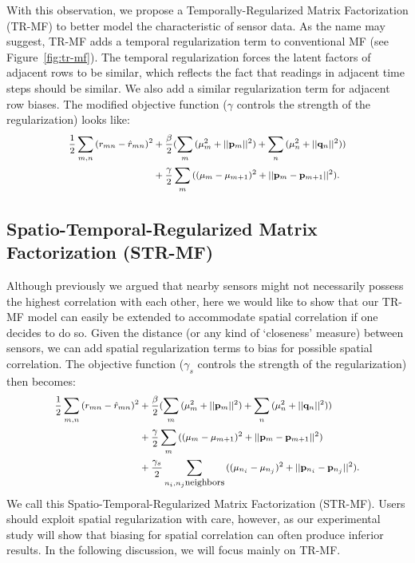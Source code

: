 With this observation, we propose a Temporally-Regularized Matrix Factorization (TR-MF) to better model the characteristic of sensor data. As the name may suggest, TR-MF adds a temporal regularization term to conventional MF (see Figure~\ref{fig:tr-mf}).
The temporal regularization forces the latent factors of adjacent rows to be similar, which reflects the fact that 
readings in adjacent time steps should be similar. We also add a similar regularization term for 
adjacent row biases.
The modified objective function ($\gamma$ controls the strength of the regularization) looks like: 
\begin{equation*}\small \begin{aligned}
\frac{1}{2}\sum_{m,n}{(r_{mn} - \hat{r}_{mn})}^2
&+ \frac{\beta}{2}(\sum_m{(\mu_m^2 + ||\mathbf{p}_m||^2)} + \sum_n{(\mu_n^2 + ||\mathbf{q}_n||^2)}) \\
&+ \frac{\gamma}{2} \sum_m{((\mu_m-\mu_{m+1})^2 + ||\mathbf{p}_m-\mathbf{p}_{m+1}||^2)}.
\end{aligned}\end{equation*}

\subsection{Spatio-Temporal-Regularized Matrix Factorization (STR-MF)}

Although previously we argued that nearby sensors might not necessarily possess the highest correlation with each other, 
here we would like to show that our TR-MF model can easily be extended to accommodate spatial correlation if one decides to do so. 
Given the distance (or any kind of `closeness' measure) between sensors, we can add spatial regularization terms to bias for 
possible spatial correlation.
The objective function ($\gamma_s$ controls the strength of the regularization) then becomes: 
\begin{equation*}\small \begin{aligned}
\frac{1}{2}\sum_{m,n}{(r_{mn} - \hat{r}_{mn})}^2
&+ \frac{\beta}{2}(\sum_m{(\mu_m^2 + ||\mathbf{p}_m||^2)} + \sum_n{(\mu_n^2 + ||\mathbf{q}_n||^2)}) \\
&+ \frac{\gamma}{2} \sum_m{((\mu_m-\mu_{m+1})^2 + ||\mathbf{p}_m-\mathbf{p}_{m+1}||^2)}\\
&+ \frac{\gamma_s}{2} \sum\limits_{n_i, n_j \mbox{neighbors}}{((\mu_{n_i}-\mu_{n_j})^2 + ||\mathbf{p}_{n_i}-\mathbf{p}_{n_j}||^2)}.
\end{aligned}\end{equation*}
We call this Spatio-Temporal-Regularized Matrix Factorization (STR-MF). 
Users should exploit spatial regularization with care, however, as our experimental study will show 
that biasing for spatial correlation can often produce inferior results. 
In the following discussion, we will focus mainly on TR-MF.

